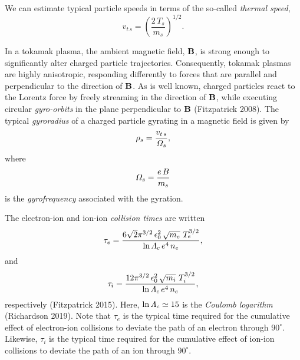 \documentclass[notitlepage,12pt]{article}
\begin{document}
We can
estimate typical particle speeds in terms of the so-called {\em thermal speed}, 
\begin{equation}\label{e1.3}
v_{t\,s} = \left(\frac{2\,T_s}{m_s}\right)^{1/2}.
\end{equation}

In a tokamak plasma,  the ambient magnetic field, 
${\bf B}$,  is strong enough to significantly alter charged particle
trajectories. Consequently,
tokamak plasmas are highly  anisotropic, responding differently to
forces that are parallel and perpendicular to the direction
of ${\bf B}$. As is well known, charged particles react to the Lorentz force
by freely streaming in the direction of ${\bf B}$, while executing
circular  {\em gyro-orbits} in the plane perpendicular to ${\bf B}$ (Fitzpatrick 2008). 
The typical   {\em gyroradius}\/ of a charged particle 
gyrating in a
magnetic field is given by
\begin{equation}
\rho_s = \frac{v_{t\,s}}{{\mit\Omega}_s},
\end{equation}
where
\begin{equation}
{\mit\Omega}_s = \frac{e\,B}{m_s}
\end{equation}
is the  {\em gyrofrequency}\/ associated with the
gyration. 

The electron-ion and ion-ion {\em collision times}\/ are
written
\begin{equation}\label{e3.74}
\tau_e = \frac{6\sqrt{2}\pi^{3/2}\,\epsilon_0^{2}\,\sqrt{m_e}\,\,T_e^{3/2}}
{\ln{\mit\Lambda}_c\, e^4\, n_e},
\end{equation}
and
\begin{equation}\label{e3.75}
\tau_i = \frac{ 12\pi^{3/2}\,\epsilon_0^{2}\,\sqrt{m_i}\,\,T_i^{3/2}}
{\ln{\mit\Lambda}_c\, e^4\, n_e},
\end{equation}
respectively (Fitzpatrick 2015). 
Here, $\ln{\mit\Lambda}_c\simeq 15$ is 
the  {\em Coulomb logarithm}\/ (Richardson 2019). Note that $\tau_e$ is the typical time required for the cumulative effect of electron-ion collisions to
deviate the path of an electron through $90^\circ$. Likewise, $\tau_i$ is the typical time required for the cumulative effect of ion-ion collisions to
deviate the path of an ion through $90^\circ$. 
\end{document}
